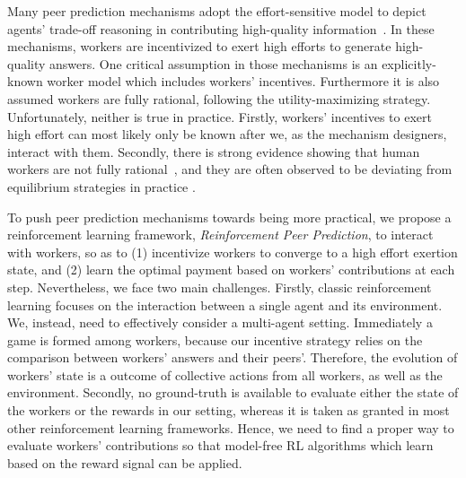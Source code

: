 \documentclass{article}
\begin{document}
Many peer prediction mechanisms adopt the effort-sensitive model to depict agents' trade-off reasoning in contributing high-quality information~\cite{witkowski2013dwelling,dasgupta2013crowdsourced,shnayder2016informed,liu2017sequential}. In these mechanisms, workers are incentivized to exert high efforts to generate high-quality answers.
One critical assumption in those mechanisms is an explicitly-known worker model which includes workers' incentives. Furthermore it is also assumed workers are fully rational, following the utility-maximizing strategy. Unfortunately, neither is true in practice. Firstly, workers' incentives %
to exert high effort can most likely only be known after we, as the mechanism designers, interact with them. Secondly, there is strong evidence showing that human workers are not fully rational~\cite{simon1979rational}, and they are often observed to be deviating from equilibrium strategies in practice \cite{mckelvey1995quantal,jurca2007robust}.



To push peer prediction mechanisms towards being more practical, we propose a reinforcement learning framework, \emph{Reinforcement Peer Prediction}, to interact with workers, so as to (1) incentivize workers to converge to a high effort exertion state, and (2) learn the optimal payment based on workers' contributions at each step.
Nevertheless, we face two main challenges.
Firstly, classic reinforcement learning focuses on the interaction between a single agent and its environment. We, instead, need to effectively consider a multi-agent setting. Immediately a game is formed among workers, because our incentive strategy relies on the comparison between workers' answers and their peers'. Therefore, the evolution of workers' state is a outcome of collective actions from all workers, as well as the environment. Secondly, no ground-truth is available to evaluate either the state of the workers or the rewards in our setting, whereas it is taken as granted in most other reinforcement learning frameworks. Hence, we need to find a proper way to evaluate workers' contributions so that model-free RL algorithms which learn based on the reward signal can be applied.
\end{document}
